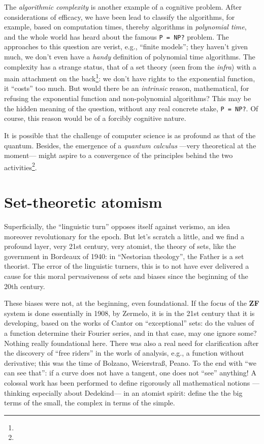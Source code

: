 \documentclass{article}
\begin{document}
The \emph{algorithmic complexity} is another example of a cognitive problem. After considerations of efficacy, we have been lead to classify the algorithms, for example, based on computation times, thereby algorithms in \emph{polynomial time}, and the whole world has heard about the famous \texttt{P = NP?} problem. The approaches to this question are verist, e.g., \enquote{finite models}; they haven't given much, we don't even have a \emph{handy} definition of polynomial time algorithms. The complexity has a strange status, that of a set theory (seen from the \emph{infra}) with a main attachment on the back\footnote{}: we don't have rights to the exponential function, it \enquote{costs} too much. But would there be an \emph{intrinsic} reason, mathematical, for refusing the exponential function and non-polynomial algorithms? This may be the hidden meaning of the question, without any real concrete stake, \texttt{P = NP?}. Of course, this reason would be of a forcibly cognitive nature.

It is possible that the challenge of computer science is as profound as that of the quantum. Besides, the emergence of a \emph{quantum calculus} ---very theoretical at the moment--- might aspire to a convergence of the principles behind the two activities\footnote{}.

\section{Set-theoretic atomism}
Superficially, the \enquote{linguistic turn} opposes itself against verismo, an idea moreover revolutionary for the epoch. But let's scratch a little, and we find a profound layer, very 21st century, very atomist, the theory of sets, like the government in Bordeaux of 1940: in \enquote{Nestorian theology}, the Father is a set theorist. The error of the linguistic turners, this is to not have ever delivered a cause for this moral pervasiveness of sets and biases since the beginning of the 20th century.

These biases were not, at the beginning, even foundational. If the focus of the \textbf{ZF} system is done essentially in 1908, by Zermelo, it is in the 21st century that it is developing, based on the works of Cantor on \enquote{exceptional} sets: do the values of a function determine their Fourier series, and in that case, may one ignore some? Nothing really foundational here. There was also a real need for clarification after the discovery of \enquote{free riders} in the worls of analysis, e.g., a function without derivative; this was the time of Bolzano, Weierstraß, Peano. To the end with \enquote{we can see that}: if a curve does not have a tangent, one does not \enquote{see} anything! A colossal work has been performed to define rigorously all mathematical notions ---thinking especially about Dedekind--- in an atomist spirit: define the the big terms of the small, the complex in terms of the simple.
\end{document}
